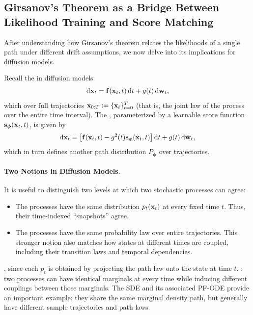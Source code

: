 \subsection{Girsanov’s Theorem as a Bridge Between Likelihood Training and Score Matching}\label{subsec:girsanov}

After understanding how Girsanov's theorem relates the likelihoods of a single
path under different drift assumptions, we now delve into its implications for
diffusion models.

Recall the  in diffusion models:
\[
\mathop{}\!\mathrm{d} {\mathbf{x}}_t = {\mathbf{f}}({\mathbf{x}}_t, t) \mathop{}\!\mathrm{d} t + g(t) \mathop{}\!\mathrm{d} {\mathbf{w}}_t,
\]
which  over full trajectories
${\mathbf{x}}_{0:T} := \{{\mathbf{x}}_t\}_{t=0}^T$ (that is, the joint law of the process over
the entire time interval).
The , parameterized by a learnable score function
${\mathbf{s}}_{\bm{\phi}}({\mathbf{x}}_t, t)$, is given by
\[
\mathop{}\!\mathrm{d} {\mathbf{x}}_t = \big[{\mathbf{f}}({\mathbf{x}}_t, t) - g^2(t) {\mathbf{s}}_{\bm{\phi}}({\mathbf{x}}_t, t)\big] \mathop{}\!\mathrm{d} t
+ g(t) \mathop{}\!\mathrm{d} \bar{{\mathbf{w}}}_t,
\]
which in turn defines another path distribution
$P_{\bm{\phi}}$ over trajectories.


\paragraph{Two Notions in Diffusion Models.}
It is useful to distinguish two levels at which two stochastic processes can
agree:
\begin{itemize}
    \item {}
    The processes have the same distribution $p_t({\mathbf{x}}_t)$ at every fixed
    time $t$. Thus, their time-indexed ``snapshots'' agree.

    \item {}
    The processes have the same probability law over entire trajectories.
    This stronger notion also matches how states at different times are
    coupled, including their transition laws and temporal dependencies.
\end{itemize}

, since
each $p_t$ is obtained by projecting the path law onto the state at time
$t$. : two processes can have identical
marginals at every time while inducing different couplings between those
marginals. The SDE and its associated PF-ODE provide an important example:
they share the same marginal density path, but generally have different
sample trajectories and path laws.


